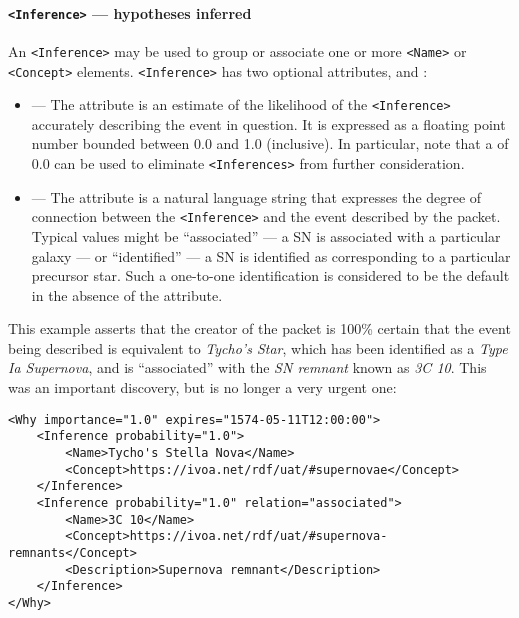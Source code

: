 \documentclass[11pt,a4paper]{ivoa}
\begin{document}
\paragraph{\texttt{<Inference>} --- hypotheses inferred}\label{sec:3.6.6}
An \verb|<Inference>| may be used to group or associate one or more \verb|<Name>|
or \verb|<Concept>| elements. \verb|<Inference>| has two optional
attributes,  and :
\begin{itemize}
\item {}\label{sec:3.6.6.1} --- The
 attribute is an estimate of the likelihood of the \verb|<Inference>|
accurately describing the event in question. It is expressed as a floating point
number bounded between 0.0 and 1.0 (inclusive). In particular, note that
a  of 0.0 can be used to eliminate \verb|<Inferences>| from further
consideration.
\item {}\label{sec:3.6.6.2} --- The 
attribute is a natural language string that expresses the degree of connection
between the \verb|<Inference>| and the event described by the packet. Typical
values might be ``associated'' --- a SN is associated with a particular galaxy
--- or ``identified'' --- a SN is identified as corresponding to a particular
precursor star. Such a one-to-one identification is considered to be the default
 in the absence of the attribute.
\end{itemize}

This example asserts that the creator of the packet is 100\% certain that the
event being described is equivalent to \emph{Tycho's Star}, which has been
identified as a \emph{Type Ia Supernova}, and is ``associated'' with the
\emph{SN remnant} known as \emph{3C 10}. This was an important discovery, but
is no longer a very urgent one:
\begin{lstlisting}
<Why importance="1.0" expires="1574-05-11T12:00:00">
    <Inference probability="1.0">
        <Name>Tycho's Stella Nova</Name>
        <Concept>https://ivoa.net/rdf/uat/#supernovae</Concept>
    </Inference>
    <Inference probability="1.0" relation="associated">
        <Name>3C 10</Name>
        <Concept>https://ivoa.net/rdf/uat/#supernova-remnants</Concept>
        <Description>Supernova remnant</Description>
    </Inference>
</Why>
\end{lstlisting}
\end{document}
